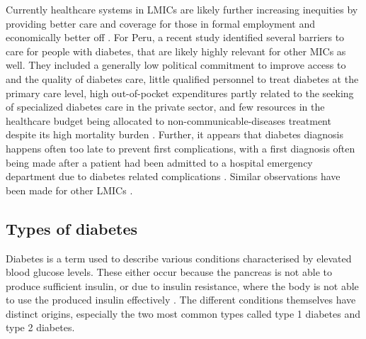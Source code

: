Currently healthcare systems in \acp{LMIC} are likely further increasing inequities by providing better care and coverage for those in formal employment and economically better off \parencite{Mills2014,DiCesare2013}. For Peru, a recent study identified several barriers to care for people with diabetes, that are likely highly relevant for other \acp{MIC} as well. They included a generally low political commitment to improve access to and the quality of diabetes care, little qualified personnel to treat diabetes at the primary care level, high out-of-pocket expenditures partly related to the seeking of specialized diabetes care in the private sector, and few resources in the healthcare budget being allocated to non-communicable-diseases treatment despite its high mortality burden \parencite{Cardenas2016}. Further, it appears that diabetes diagnosis happens often too late to prevent first complications, with a first diagnosis often being made after a patient had been admitted to a hospital emergency department due to diabetes related complications \parencite{Cardenas2016}. Similar observations have been made for other \acp{LMIC} \parencite{Beran2015,WHO2014}.

 
\subsection{Types of diabetes}

Diabetes is a term used to describe various conditions characterised by elevated blood glucose levels. These either occur because the pancreas is not able to produce sufficient insulin, or due to insulin resistance, where the body is not able to use the produced insulin effectively \parencite{WorldHealthOrganization2016}. The different conditions themselves have distinct origins, especially the two most common types called type 1 diabetes and type 2 diabetes. 

